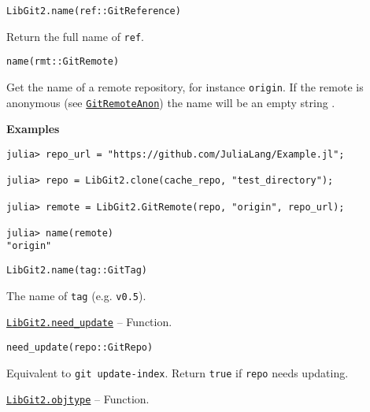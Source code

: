 \begin{adjustwidth}{2em}{0pt}


\begin{verbatim}
LibGit2.name(ref::GitReference)
\end{verbatim}

Return the full name of \texttt{ref}.




\begin{lstlisting}
name(rmt::GitRemote)
\end{lstlisting}

Get the name of a remote repository, for instance \texttt{{\textquotedbl}origin{\textquotedbl}}. If the remote is anonymous (see \hyperlink{13915605113589562056}{\texttt{GitRemoteAnon}}) the name will be an empty string \texttt{{\textquotedbl}{\textquotedbl}}.

\textbf{Examples}


\begin{verbatim}
julia> repo_url = "https://github.com/JuliaLang/Example.jl";

julia> repo = LibGit2.clone(cache_repo, "test_directory");

julia> remote = LibGit2.GitRemote(repo, "origin", repo_url);

julia> name(remote)
"origin"
\end{verbatim}




\begin{lstlisting}
LibGit2.name(tag::GitTag)
\end{lstlisting}

The name of \texttt{tag} (e.g. \texttt{{\textquotedbl}v0.5{\textquotedbl}}).



\end{adjustwidth}
\hypertarget{7748563965577890862}{} 
\hyperlink{7748563965577890862}{\texttt{LibGit2.need\_update}}  -- {Function.}

\begin{adjustwidth}{2em}{0pt}


\begin{verbatim}
need_update(repo::GitRepo)
\end{verbatim}

Equivalent to \texttt{git update-index}. Return \texttt{true} if \texttt{repo} needs updating.



\end{adjustwidth}
\hypertarget{5024227788763319693}{} 
\hyperlink{5024227788763319693}{\texttt{LibGit2.objtype}}  -- {Function.}

